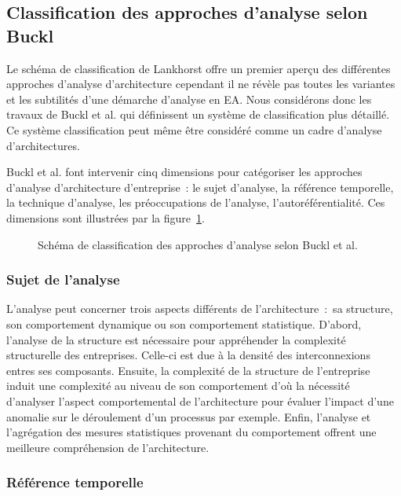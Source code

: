 \subsection{Classification des approches d'analyse selon Buckl}
	
Le schéma de classification de Lankhorst \cite{lankhorst2013enterprise} offre un premier aperçu des différentes approches d'analyse d'architecture cependant il ne révèle pas toutes les variantes et les subtilités d'une démarche d'analyse en EA. Nous considérons donc les travaux de Buckl et al. \cite{buckl2009classifying} qui définissent un système de classification plus détaillé. Ce système classification peut même être considéré comme un cadre d'analyse d'architectures.

Buckl et al. \cite{buckl2009classifying} font intervenir cinq dimensions pour catégoriser
les approches d'analyse d'architecture d'entreprise~: le sujet d'analyse, la référence temporelle,
la technique d'analyse, les préoccupations de l'analyse, l'autoréférentialité.
Ces dimensions sont illustrées par la figure~\ref{fig:classBuckl}.

\begin{figure}[!ht]
	
	\caption{Schéma de classification des approches d'analyse selon Buckl et al. \protect\cite{buckl2009classifying}}
	\label{fig:classBuckl}
\end{figure}


\subsubsection{Sujet de l'analyse}

L'analyse peut concerner trois aspects différents de l'architecture~:~sa
structure, son comportement dynamique ou son comportement statistique. D'abord,
l'analyse de la structure est nécessaire pour appréhender la complexité
structurelle des entreprises. Celle-ci est due à la densité des interconnexions
entres ses composants. Ensuite, la complexité de la structure de l'entreprise
induit une complexité au niveau de son comportement d'où la nécessité
d'analyser l'aspect comportemental de l'architecture pour évaluer l'impact
d'une anomalie sur le déroulement d'un processus par exemple. Enfin, l'analyse et
l'agrégation des mesures statistiques provenant du comportement offrent une
meilleure compréhension de l'architecture.

\subsubsection{Référence temporelle}

